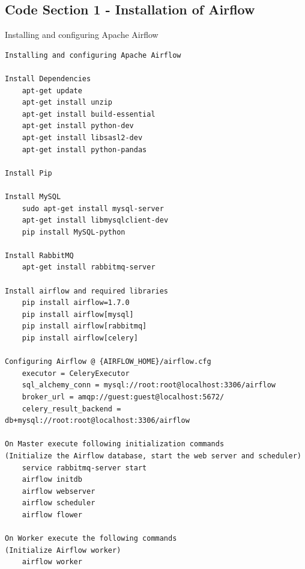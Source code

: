 \documentclass[10pt,onecolumn]{IEEEtran}
\begin{document}
\subsection*{Code Section 1 - Installation of Airflow}
Installing and configuring Apache Airflow
{\scriptsize
\begin{Verbatim}
Installing and configuring Apache Airflow

Install Dependencies
	apt-get update
	apt-get install unzip
	apt-get install build-essential
	apt-get install python-dev
	apt-get install libsasl2-dev
	apt-get install python-pandas	

Install Pip

Install MySQL
	sudo apt-get install mysql-server
	apt-get install libmysqlclient-dev
	pip install MySQL-python

Install RabbitMQ
	apt-get install rabbitmq-server

Install airflow and required libraries
	pip install airflow=1.7.0
	pip install airflow[mysql]
	pip install airflow[rabbitmq]
	pip install airflow[celery]
	
Configuring Airflow @ {AIRFLOW_HOME}/airflow.cfg
	executor = CeleryExecutor
	sql_alchemy_conn = mysql://root:root@localhost:3306/airflow
	broker_url = amqp://guest:guest@localhost:5672/
	celery_result_backend = db+mysql://root:root@localhost:3306/airflow

On Master execute following initialization commands 
(Initialize the Airflow database, start the web server and scheduler)
	service rabbitmq-server start
	airflow initdb
	airflow webserver
	airflow scheduler
	airflow flower

On Worker execute the following commands 
(Initialize Airflow worker)
	airflow worker
	
\end{Verbatim}
} %
\end{document}
